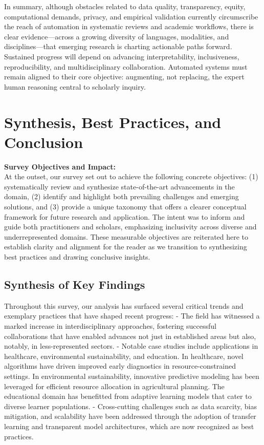 \documentclass[sigconf]{acmart}
\begin{document}
In summary, although obstacles related to data quality, transparency, equity, computational demands, privacy, and empirical validation currently circumscribe the reach of automation in systematic reviews and academic workflows, there is clear evidence—across a growing diversity of languages, modalities, and disciplines—that emerging research is charting actionable paths forward. Sustained progress will depend on advancing interpretability, inclusiveness, reproducibility, and multidisciplinary collaboration. Automated systems must remain aligned to their core objective: augmenting, not replacing, the expert human reasoning central to scholarly inquiry.

\section{Synthesis, Best Practices, and Conclusion}

\textbf{Survey Objectives and Impact:}\\
At the outset, our survey set out to achieve the following concrete objectives: (1) systematically review and synthesize state-of-the-art advancements in the domain, (2) identify and highlight both prevailing challenges and emerging solutions, and (3) provide a unique taxonomy that offers a clearer conceptual framework for future research and application. The intent was to inform and guide both practitioners and scholars, emphasizing inclusivity across diverse and underrepresented domains. These measurable objectives are reiterated here to establish clarity and alignment for the reader as we transition to synthesizing best practices and drawing conclusive insights.

\subsection{Synthesis of Key Findings}

Throughout this survey, our analysis has surfaced several critical trends and exemplary practices that have shaped recent progress:
- The field has witnessed a marked increase in interdisciplinary approaches, fostering successful collaborations that have enabled advances not just in established areas but also, notably, in less-represented sectors.
- Notable case studies include applications in healthcare, environmental sustainability, and education. In healthcare, novel algorithms have driven improved early diagnostics in resource-constrained settings. In environmental sustainability, innovative predictive modeling has been leveraged for efficient resource allocation in agricultural planning. The educational domain has benefitted from adaptive learning models that cater to diverse learner populations.
- Cross-cutting challenges such as data scarcity, bias mitigation, and scalability have been addressed through the adoption of transfer learning and transparent model architectures, which are now recognized as best practices.
\end{document}
